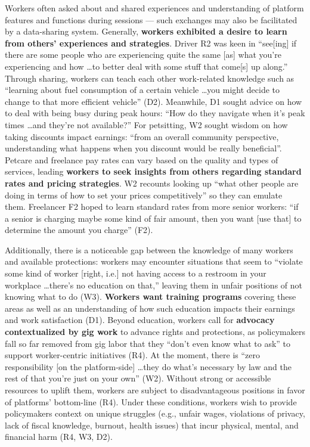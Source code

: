 \label{h.pplzn44x8y2i}
Workers often asked about and shared experiences and understanding of platform features and functions during sessions --- such exchanges may also be facilitated by a data-sharing system. 
Generally, \textbf{workers exhibited a desire to learn from others' experiences and strategies}. Driver R2 was keen in ``see[ing] if there are some people who are experiencing quite the same [as] what you're experiencing and how  \dots  to better deal with some stuff that come[s] up along.'' Through sharing, workers can teach each other work-related knowledge such as ``learning about fuel consumption of a certain vehicle \dots you might decide to change to that more efficient vehicle'' (D2). Meanwhile, D1 sought advice on how to deal with being busy during peak hours: ``How do they navigate when it's peak times  \dots  and they're not available?'' For petsitting, W2 sought wisdom on how taking discounts impact earnings: ``from an overall community perspective, understanding what happens when you discount would be really beneficial''. Petcare and freelance pay rates can vary based on the quality and types of services, leading \textbf{workers to seek insights from others regarding standard rates and pricing strategies}. W2 recounts looking up ``what other people are doing in terms of how to set your prices competitively'' so they can emulate them. Freelancer F2 hoped to learn standard rates from more senior workers: ``if a senior is charging maybe some kind of fair amount, then you want [use that] to determine the amount you charge'' (F2).  

Additionally, there is a noticeable gap between the knowledge of many workers and available protections: workers may encounter situations that seem to ``violate some kind of worker [right, i.e.] not having access to a restroom in your workplace \dots there's no education on that,'' leaving them in unfair positions of not knowing what to do (W3).
\textbf{Workers want training programs} covering these areas as well as an understanding of how such education impacts their earnings and work satisfaction (D1).
Beyond education, workers call for \textbf{advocacy contextualized by gig work} to advance rights and protections, as policymakers fall so far removed from gig labor that they ``don't even know what to ask'' to support worker-centric initiatives (R4). At the moment, there is ``zero responsibility [on the platform-side] \dots they do what's necessary by law and the rest of that you're just on your own'' (W2). Without strong or accessible resources to uplift them, workers are subject to disadvantageous positions in favor of platforms' bottom-line (R4). Under these conditions, workers wish to provide policymakers context on unique struggles (e.g., unfair wages, violations of privacy, lack of fiscal knowledge, burnout, health issues) that incur physical, mental, and financial harm (R4, W3, D2). 


